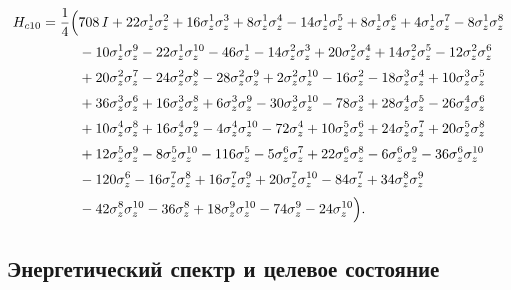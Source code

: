 \begin{equation}
\begin{aligned}
H_{c10}= \frac14\Bigl(&
 708\,I
+ 22\sigma_{z}^{1}\sigma_{z}^{2}
+ 16\sigma_{z}^{1}\sigma_{z}^{3}
+  8\sigma_{z}^{1}\sigma_{z}^{4}
- 14\sigma_{z}^{1}\sigma_{z}^{5}
+  8\sigma_{z}^{1}\sigma_{z}^{6}
+  4\sigma_{z}^{1}\sigma_{z}^{7}
-  8\sigma_{z}^{1}\sigma_{z}^{8} \\[2pt]
&{}- 10\sigma_{z}^{1}\sigma_{z}^{9}
- 22\sigma_{z}^{1}\sigma_{z}^{10}
- 46\sigma_{z}^{1}
- 14\sigma_{z}^{2}\sigma_{z}^{3}
+ 20\sigma_{z}^{2}\sigma_{z}^{4}
+ 14\sigma_{z}^{2}\sigma_{z}^{5}
- 12\sigma_{z}^{2}\sigma_{z}^{6} \\[2pt]
&{}+ 20\sigma_{z}^{2}\sigma_{z}^{7}
- 24\sigma_{z}^{2}\sigma_{z}^{8}
- 28\sigma_{z}^{2}\sigma_{z}^{9}
+  2\sigma_{z}^{2}\sigma_{z}^{10}
- 16\sigma_{z}^{2}
- 18\sigma_{z}^{3}\sigma_{z}^{4}
+ 10\sigma_{z}^{3}\sigma_{z}^{5} \\[2pt]
&{}+ 36\sigma_{z}^{3}\sigma_{z}^{6}
+ 16\sigma_{z}^{3}\sigma_{z}^{8}
+  6\sigma_{z}^{3}\sigma_{z}^{9}
- 30\sigma_{z}^{3}\sigma_{z}^{10}
- 78\sigma_{z}^{3}
+ 28\sigma_{z}^{4}\sigma_{z}^{5}
- 26\sigma_{z}^{4}\sigma_{z}^{6} \\[2pt]
&{}+ 10\sigma_{z}^{4}\sigma_{z}^{8}
+ 16\sigma_{z}^{4}\sigma_{z}^{9}
-  4\sigma_{z}^{4}\sigma_{z}^{10}
- 72\sigma_{z}^{4}
+ 10\sigma_{z}^{5}\sigma_{z}^{6}
+ 24\sigma_{z}^{5}\sigma_{z}^{7}
+ 20\sigma_{z}^{5}\sigma_{z}^{8} \\[2pt]
&{}+ 12\sigma_{z}^{5}\sigma_{z}^{9}
-  8\sigma_{z}^{5}\sigma_{z}^{10}
- 116\sigma_{z}^{5}
-  5\sigma_{z}^{6}\sigma_{z}^{7}
+ 22\sigma_{z}^{6}\sigma_{z}^{8}
-  6\sigma_{z}^{6}\sigma_{z}^{9}
- 36\sigma_{z}^{6}\sigma_{z}^{10} \\[2pt]
&{}- 120\sigma_{z}^{6}
- 16\sigma_{z}^{7}\sigma_{z}^{8}
+ 16\sigma_{z}^{7}\sigma_{z}^{9}
+ 20\sigma_{z}^{7}\sigma_{z}^{10}
-  84\sigma_{z}^{7}
+ 34\sigma_{z}^{8}\sigma_{z}^{9} \\[2pt]
&{}- 42\sigma_{z}^{8}\sigma_{z}^{10}
- 36\sigma_{z}^{8}
+ 18\sigma_{z}^{9}\sigma_{z}^{10}
- 74\sigma_{z}^{9}
- 24\sigma_{z}^{10}
\Bigr).
\end{aligned}
\end{equation}

\subsection*{Энергетический спектр и целевое состояние}

